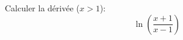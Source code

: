 Calculer la d\'eriv\'ee ($x>1$):
\begin{displaymath}
 \ln \left( \frac{x+1}{x-1}\right) 
\end{displaymath}
\bigskip
